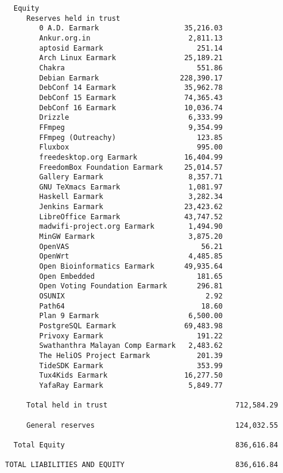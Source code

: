 \documentclass[letterpaper]{report}
\begin{document}
\begin{verbatim}
     Equity
        Reserves held in trust
           0 A.D. Earmark                    35,216.03
           Ankur.org.in                       2,811.13
           aptosid Earmark                      251.14
           Arch Linux Earmark                25,189.21
           Chakra                               551.86
           Debian Earmark                   228,390.17
           DebConf 14 Earmark                35,962.78
           DebConf 15 Earmark                74,365.43
           DebConf 16 Earmark                10,036.74
           Drizzle                            6,333.99
           FFmpeg                             9,354.99
           FFmpeg (Outreachy)                   123.85
           Fluxbox                              995.00
           freedesktop.org Earmark           16,404.99
           FreedomBox Foundation Earmark     25,014.57
           Gallery Earmark                    8,357.71
           GNU TeXmacs Earmark                1,081.97
           Haskell Earmark                    3,282.34
           Jenkins Earmark                   23,423.62
           LibreOffice Earmark               43,747.52
           madwifi-project.org Earmark        1,494.90
           MinGW Earmark                      3,875.20
           OpenVAS                               56.21
           OpenWrt                            4,485.85
           Open Bioinformatics Earmark       49,935.64
           Open Embedded                        181.65
           Open Voting Foundation Earmark       296.81
           OSUNIX                                 2.92
           Path64                                18.60
           Plan 9 Earmark                     6,500.00
           PostgreSQL Earmark                69,483.98
           Privoxy Earmark                      191.22
           Swathanthra Malayan Comp Earmark   2,483.62
           The HeliOS Project Earmark           201.39
           TideSDK Earmark                      353.99
           Tux4Kids Earmark                  16,277.50
           YafaRay Earmark                    5,849.77

        Total held in trust                              712,584.29

        General reserves                                 124,032.55

     Total Equity                                        836,616.84

   TOTAL LIABILITIES AND EQUITY                          836,616.84
\end{verbatim}
\end{document}
